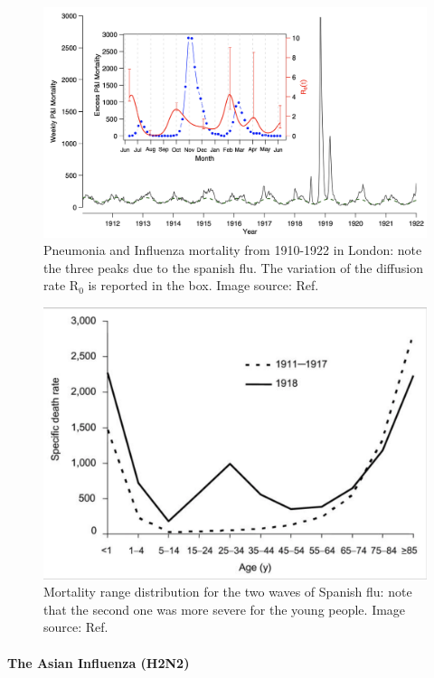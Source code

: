\documentclass[
12pt, %
a4paper, %
oneside, %
headinclude,footinclude, %
BCOR5mm, %
]{scrartcl}
\begin{document}
\begin{figure}[h]
 \centering
 \includegraphics[width=1\linewidth]{Figures/SpanishFLU.png} 
 \caption{Pneumonia and Influenza mortality from 1910-1922 in London: note the three peaks due to the spanish flu. The variation of the diffusion rate R$_{0}$ is reported in the box. Image source: Ref. \cite{he2011mechanistic} }
 \label{SpanishFLU}
\end{figure}

\begin{figure}[h]
 \centering
 \includegraphics[width=0.6\linewidth]{Figures/Mortality_spanish_flu.png} 
 \caption{Mortality range distribution for the two waves of Spanish flu: note that the second one was more severe for the young people. Image source: Ref. \cite{taubenberger20061918}}
 \label{Mortality_spanish_flu}
\end{figure}

\clearpage

\paragraph{The Asian Influenza (H2N2)}
\end{document}
